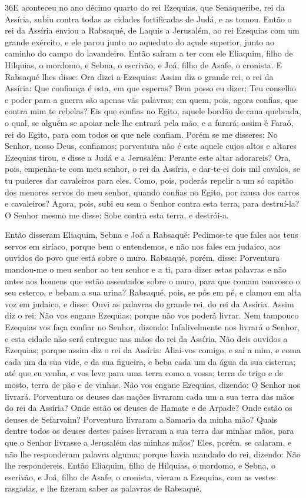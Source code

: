 \lettrine{36}{}E aconteceu no ano décimo quarto do rei
Ezequias, que Senaqueribe, rei da Assíria, subiu contra todas as
cidades fortificadas de Judá, e as tomou. Então o rei da Assíria
enviou a Rabsaqué, de Laquis a Jerusalém, ao rei Ezequias com um
grande exército, e ele parou junto ao aqueduto do açude superior,
junto ao caminho do campo do lavandeiro. Então saíram a ter com
ele Eliaquim, filho de Hilquias, o mordomo, e Sebna, o escrivão, e
Joá, filho de Asafe, o cronista. E Rabsaqué lhes disse: Ora
dizei a Ezequias: Assim diz o grande rei, o rei da Assíria: Que
confiança é esta, em que esperas? Bem posso eu dizer: Teu
conselho e poder para a guerra são apenas vãs palavras; em quem,
pois, agora confias, que contra mim te rebelas? Eis que confias
no Egito, aquele bordão de cana quebrada, o qual, se alguém se
apoiar nele lhe entrará pela mão, e a furará; assim é Faraó, rei do
Egito, para com todos os que nele confiam. Porém se me disseres:
No Senhor, nosso Deus, confiamos; porventura não é este aquele cujos
altos e altares Ezequias tirou, e disse a Judá e a Jerusalém:
Perante este altar adorareis? Ora, pois, empenha-te com meu
senhor, o rei da Assíria, e dar-te-ei dois mil cavalos, se tu
puderes dar cavaleiros para eles. Como, pois, poderás repelir a
um só capitão dos menores servos do meu senhor, quando confias no
Egito, por causa dos carros e cavaleiros? Agora, pois, subi
eu sem o Senhor contra esta terra, para destruí-la? O Senhor mesmo
me disse: Sobe contra esta terra, e destrói-a.

Então disseram Eliaquim, Sebna e Joá a Rabsaqué: Pedimos-te que
fales aos teus servos em siríaco, porque bem o entendemos, e não nos
fales em judaico, aos ouvidos do povo que está sobre o muro.
Rabsaqué, porém, disse: Porventura mandou-me o meu senhor ao
teu senhor e a ti, para dizer estas palavras e não antes aos homens
que estão assentados sobre o muro, para que comam convosco o seu
esterco, e bebam a sua urina? Rabsaqué, pois, se pôs em pé, e
clamou em alta voz em judaico, e disse: Ouvi as palavras do grande
rei, do rei da Assíria. Assim diz o rei: Não vos engane
Ezequias; porque não vos poderá livrar. Nem tampouco Ezequias
vos faça confiar no Senhor, dizendo: Infalivelmente nos livrará o
Senhor, e esta cidade não será entregue nas mãos do rei da Assíria.
Não deis ouvidos a Ezequias; porque assim diz o rei da
Assíria: Aliai-vos comigo, e saí a mim, e coma cada um da sua vide,
e da sua figueira, e beba cada um da água da sua cisterna;
até que eu venha, e vos leve para uma terra como a vossa;
terra de trigo e de mosto, terra de pão e de vinhas. Não vos
engane Ezequias, dizendo: O Senhor nos livrará. Porventura os deuses
das nações livraram cada um a sua terra das mãos do rei da Assíria?
Onde estão os deuses de Hamate e de Arpade? Onde estão os
deuses de Sefarvaim? Porventura livraram a Samaria da minha mão?
Quais dentre todos os deuses destes países livraram a sua
terra das minhas mãos, para que o Senhor livrasse a Jerusalém das
minhas mãos? Eles, porém, se calaram, e não lhe responderam
palavra alguma; porque havia mandado do rei, dizendo: Não lhe
respondereis. Então Eliaquim, filho de Hilquias, o mordomo, e
Sebna, o escrivão, e Joá, filho de Asafe, o cronista, vieram a
Ezequias, com as vestes rasgadas, e lhe fizeram saber as palavras de
Rabsaqué.

